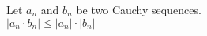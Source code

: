 \documentclass[preview]{standalone}
\begin{document}
\begin{center}
Let $a_n$ and $b_n$ be two Cauchy sequences.\\$|a_n \cdot b_n| \leq |a_n| \cdot |b_n|$
\end{center}
\end{document}
